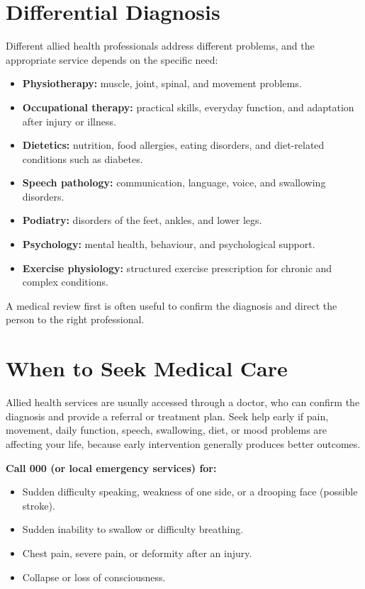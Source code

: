 \section*{Differential Diagnosis}
Different allied health professionals address different problems, and the appropriate service depends on the specific need:

\begin{itemize}
    \item \textbf{Physiotherapy:} muscle, joint, spinal, and movement problems.
    \item \textbf{Occupational therapy:} practical skills, everyday function, and adaptation after injury or illness.
    \item \textbf{Dietetics:} nutrition, food allergies, eating disorders, and diet-related conditions such as diabetes.
    \item \textbf{Speech pathology:} communication, language, voice, and swallowing disorders.
    \item \textbf{Podiatry:} disorders of the feet, ankles, and lower legs.
    \item \textbf{Psychology:} mental health, behaviour, and psychological support.
    \item \textbf{Exercise physiology:} structured exercise prescription for chronic and complex conditions.
\end{itemize}

A medical review first is often useful to confirm the diagnosis and direct the person to the right professional.

\section*{When to Seek Medical Care}
Allied health services are usually accessed through a doctor, who can confirm the diagnosis and provide a referral or treatment plan. Seek help early if pain, movement, daily function, speech, swallowing, diet, or mood problems are affecting your life, because early intervention generally produces better outcomes.

\textbf{Call 000 (or local emergency services) for:}
\begin{itemize}
    \item Sudden difficulty speaking, weakness of one side, or a drooping face (possible stroke).
    \item Sudden inability to swallow or difficulty breathing.
    \item Chest pain, severe pain, or deformity after an injury.
    \item Collapse or loss of consciousness.
\end{itemize}

